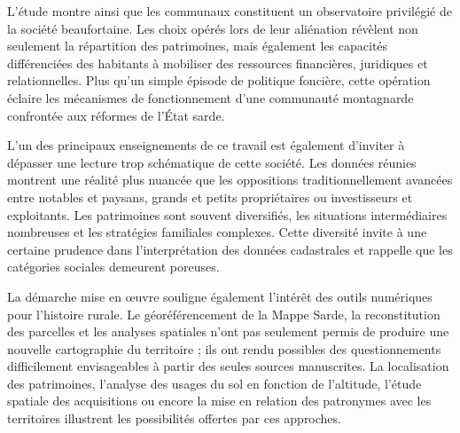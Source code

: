 \documentclass[12pt,a4paper]{report}
\begin{document}
L'étude montre ainsi que les communaux constituent un observatoire privilégié de la société beaufortaine. Les choix opérés lors de leur aliénation révèlent non seulement la répartition des patrimoines, mais également les capacités différenciées des habitants à mobiliser des ressources financières, juridiques et relationnelles. Plus qu'un simple épisode de politique foncière, cette opération éclaire les mécanismes de fonctionnement d'une communauté montagnarde confrontée aux réformes de l'État sarde.

L'un des principaux enseignements de ce travail est également d'inviter à dépasser une lecture trop schématique de cette société. Les données réunies montrent une réalité plus nuancée que les oppositions traditionnellement avancées entre notables et paysans, grands et petits propriétaires ou investisseurs et exploitants. Les patrimoines sont souvent diversifiés, les situations intermédiaires nombreuses et les stratégies familiales complexes. Cette diversité invite à une certaine prudence dans l'interprétation des données cadastrales et rappelle que les catégories sociales demeurent poreuses.

La démarche mise en œuvre souligne également l'intérêt des outils numériques pour l'histoire rurale. Le géoréférencement de la Mappe Sarde, la reconstitution des parcelles et les analyses spatiales n'ont pas seulement permis de produire une nouvelle cartographie du territoire ; ils ont rendu possibles des questionnements difficilement envisageables à partir des seules sources manuscrites. La localisation des patrimoines, l'analyse des usages du sol en fonction de l'altitude, l'étude spatiale des acquisitions ou encore la mise en relation des patronymes avec les territoires illustrent les possibilités offertes par ces approches.
\end{document}
